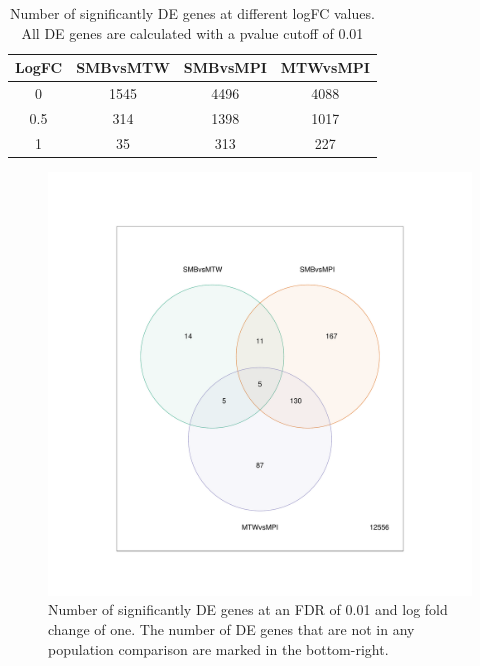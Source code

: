 \documentclass[12pt,a4paper,titlepage,twoside,openright]{book}
\begin{document}
\begin{mainmatter}
{{{\begin{table}[htb!]
\caption{Number of significantly DE genes at different logFC values. All DE genes are calculated with a pvalue cutoff of 0.01}
\centering
\begin{tabular}{c c c c}
\hline\hline 
LogFC & SMBvsMTW & SMBvsMPI & MTWvsMPI \\ [0.5ex] 
\hline
0 & 1545 & 4496 & 4088 \\ 
\hline
0.5 & 314 & 1398 & 1017 \\
\hline
1 & 35 & 313 & 227 \\
\hline
\end{tabular}
\label{table:LogFC THresholds}
\end{table}

\begin{figure}[htb!]
\centering
\includegraphics[width=\textwidth,height=\textheight,keepaspectratio]{Figures/vennDiagram_allSigDEGenes_pval01_FDR1_dupCor.pdf}
\caption{Number of significantly DE genes at an FDR of 0.01 and log fold change of one. The number of DE genes that are not in any population comparison are marked in the bottom-right.}
\label{fig:Venn Diagram between Islands}
\end{figure}

}}}
\end{mainmatter}
\end{document}
